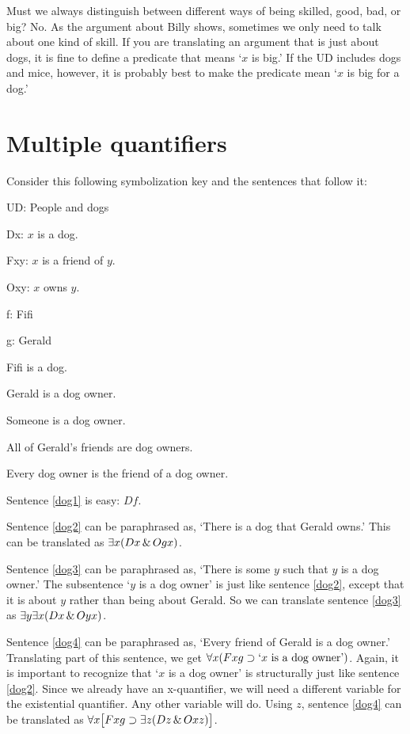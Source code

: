 Must we always distinguish between different ways of being skilled, good, bad, or big? No. As the argument about Billy shows, sometimes we only need to talk about one kind of skill. If you are translating an argument that is just about dogs, it is fine to define a predicate that means `$x$ is big.' If the UD includes dogs and mice, however, it is probably best to make the predicate mean `$x$ is big for a dog.'


\section{Multiple quantifiers}
Consider this following symbolization key and the sentences that follow it:
\begin{ekey}
\item{UD:} People and dogs
\item{Dx:} $x$ is a dog.
\item{Fxy:} $x$ is a friend of $y$.
\item{Oxy:} $x$ owns $y$.
\item{f:} Fifi
\item{g:} Gerald
\end{ekey}

\begin{earg}
\item[\ex{dog1}] Fifi is a dog.
\item[\ex{dog2}] Gerald is a dog owner.
\item[\ex{dog3}] Someone is a dog owner.
\item[\ex{dog4}] All of Gerald's friends are dog owners.
\item[\ex{dog5}] Every dog owner is the friend of a dog owner.
\end{earg}

Sentence \ref{dog1} is easy: $Df$.

Sentence \ref{dog2} can be paraphrased as, `There is a dog that Gerald owns.' This can be translated as $\exists x(Dx \,\&\, Ogx)$.

Sentence \ref{dog3} can be paraphrased as, `There is some $y$ such that $y$ is a dog owner.' The subsentence `$y$ is a dog owner' is just like sentence \ref{dog2}, except that it is about $y$ rather than being about Gerald. So we can translate sentence \ref{dog3} as $\exists y \exists x(Dx \,\&\, Oyx)$. 

Sentence \ref{dog4} can be paraphrased as, `Every friend of Gerald is a dog owner.' Translating part of this sentence, we get $\forall x(Fxg \supset\mbox{`$x$ is a dog owner'})$. Again, it is important to recognize that `$x$ is a dog owner' is structurally just like sentence \ref{dog2}. Since we already have an x-quantifier, we will need a different variable for the existential quantifier. Any other variable will do. Using $z$, sentence \ref{dog4} can be translated as $\forall x\bigl[Fxg \supset\exists z(Dz \,\&\, Oxz)\bigr]$.

